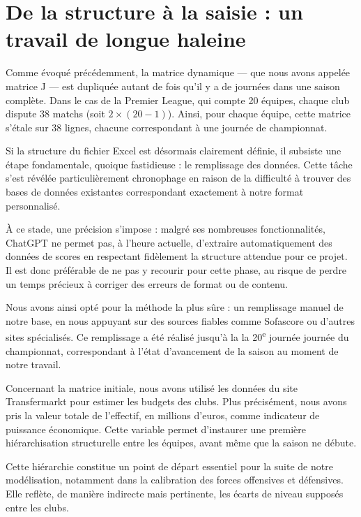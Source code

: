 \documentclass[12pt]{report}
\begin{document}
\section{De la structure à la saisie : un travail de longue haleine}

Comme évoqué précédemment, la matrice dynamique — que nous avons appelée matrice J — est dupliquée autant de fois qu’il y a de journées dans une saison complète. Dans le cas de la Premier League, qui compte 20 équipes, chaque club dispute 38 matchs (soit $2 \times (20 - 1)$). Ainsi, pour chaque équipe, cette matrice s’étale sur 38 lignes, chacune correspondant à une journée de championnat.

Si la structure du fichier Excel est désormais clairement définie, il subsiste une étape fondamentale, quoique fastidieuse : le remplissage des données. Cette tâche s’est révélée particulièrement chronophage en raison de la difficulté à trouver des bases de données existantes correspondant exactement à notre format personnalisé.

À ce stade, une précision s’impose : malgré ses nombreuses fonctionnalités, ChatGPT ne permet pas, à l’heure actuelle, d’extraire automatiquement des données de scores en respectant fidèlement la structure attendue pour ce projet. Il est donc préférable de ne pas y recourir pour cette phase, au risque de perdre un temps précieux à corriger des erreurs de format ou de contenu.

Nous avons ainsi opté pour la méthode la plus sûre : un remplissage manuel de notre base, en nous appuyant sur des sources fiables comme Sofascore ou d’autres sites spécialisés. Ce remplissage a été réalisé jusqu’à la la 20\textsuperscript{e} journée
 journée du championnat, correspondant à l’état d’avancement de la saison au moment de notre travail.

Concernant la matrice initiale, nous avons utilisé les données du site Transfermarkt pour estimer les budgets des clubs. Plus précisément, nous avons pris la valeur totale de l’effectif, en millions d’euros, comme indicateur de puissance économique. Cette variable permet d’instaurer une première hiérarchisation structurelle entre les équipes, avant même que la saison ne débute.

Cette hiérarchie constitue un point de départ essentiel pour la suite de notre modélisation, notamment dans la calibration des forces offensives et défensives. Elle reflète, de manière indirecte mais pertinente, les écarts de niveau supposés entre les clubs.
\end{document}
